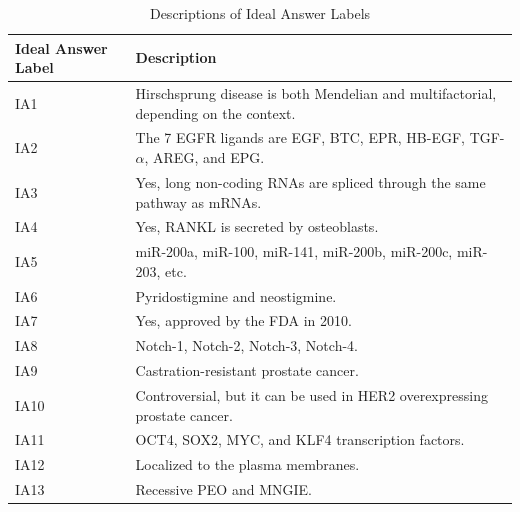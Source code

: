 \documentclass[pdflatex,sn-mathphys-num]{sn-jnl}%
\begin{document}
\begin{appendices}
\begin{table}[h]
\caption{Descriptions of Ideal Answer Labels}\label{tab:ideal_answer_descriptions}
\begin{tabular}{@{}lp{12cm}@{}}
\toprule
\textbf{Ideal Answer Label} & \textbf{Description} \\
\midrule
IA1 & Hirschsprung disease is both Mendelian and multifactorial, depending on the context. \\
IA2 & The 7 EGFR ligands are EGF, BTC, EPR, HB-EGF, TGF-$\alpha$, AREG, and EPG. \\
IA3 & Yes, long non-coding RNAs are spliced through the same pathway as mRNAs. \\
IA4 & Yes, RANKL is secreted by osteoblasts. \\
IA5 & miR-200a, miR-100, miR-141, miR-200b, miR-200c, miR-203, etc. \\
IA6 & Pyridostigmine and neostigmine. \\
IA7 & Yes, approved by the FDA in 2010. \\
IA8 & Notch-1, Notch-2, Notch-3, Notch-4. \\
IA9 & Castration-resistant prostate cancer. \\
IA10 & Controversial, but it can be used in HER2 overexpressing prostate cancer. \\
IA11 & OCT4, SOX2, MYC, and KLF4 transcription factors. \\
IA12 & Localized to the plasma membranes. \\
IA13 & Recessive PEO and MNGIE. \\
\bottomrule
\end{tabular}
\end{table}


\end{appendices}


\end{document}
